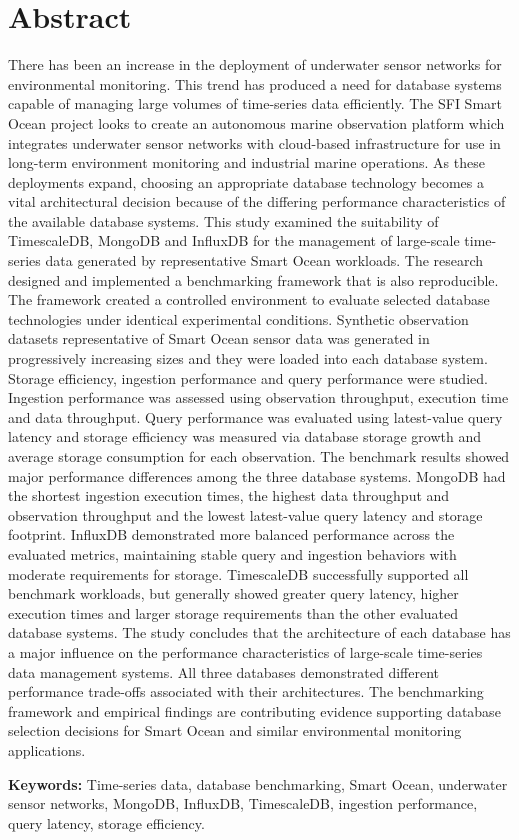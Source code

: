 \chapter*{Abstract}

There has been an increase in the deployment of underwater sensor networks for environmental monitoring. This trend has produced a need for database systems capable of managing large volumes of time-series data efficiently. The SFI Smart Ocean project looks to create an autonomous marine observation platform which integrates underwater sensor networks with cloud-based infrastructure for use in long-term environment monitoring and industrial marine operations. As these deployments expand, choosing an appropriate database technology becomes a vital architectural decision because of the differing performance characteristics of the available database systems. This study examined the suitability of TimescaleDB, MongoDB and InfluxDB for the management of large-scale time-series data generated by representative Smart Ocean workloads. The research designed and implemented a benchmarking framework that is also reproducible. The framework created a controlled environment to evaluate selected database technologies under identical experimental conditions. Synthetic observation datasets representative of Smart Ocean sensor data was generated in progressively increasing sizes and they were loaded into each database system. Storage efficiency, ingestion performance and query performance were studied. Ingestion performance was assessed using observation throughput, execution time and data throughput. Query performance was evaluated using latest-value query latency and storage efficiency was measured via database storage growth and average storage consumption for each observation. The benchmark results showed major performance differences among the three database systems. MongoDB had the shortest ingestion execution times, the highest data throughput and observation throughput and the lowest latest-value query latency and storage footprint. InfluxDB demonstrated more balanced performance across the evaluated metrics, maintaining stable query and ingestion behaviors with moderate requirements for storage. TimescaleDB successfully supported all benchmark workloads, but generally showed greater query latency, higher execution times and larger storage requirements than the other evaluated database systems. The study concludes that the architecture of each database has a major influence on the performance characteristics of large-scale time-series data management systems. All three databases demonstrated different performance trade-offs associated with their architectures. The benchmarking framework and empirical findings are contributing evidence supporting database selection decisions for Smart Ocean and similar environmental monitoring applications. 


\textbf{Keywords:} Time-series data, database benchmarking, Smart Ocean, underwater sensor networks, MongoDB, InfluxDB, TimescaleDB, ingestion performance, query latency, storage efficiency.




